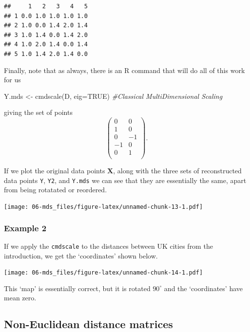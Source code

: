 \documentclass[
]{book}
\newenvironment{Shaded}{\begin{snugshade}}{\end{snugshade}}
\newcommand{\AttributeTok}[1]{\textcolor[rgb]{0.77,0.63,0.00}{#1}}
\newcommand{\CommentTok}[1]{\textcolor[rgb]{0.56,0.35,0.01}{\textit{#1}}}
\newcommand{\ConstantTok}[1]{\textcolor[rgb]{0.00,0.00,0.00}{#1}}
\newcommand{\FunctionTok}[1]{\textcolor[rgb]{0.00,0.00,0.00}{#1}}
\newcommand{\NormalTok}[1]{#1}
\newcommand{\OtherTok}[1]{\textcolor[rgb]{0.56,0.35,0.01}{#1}}
\theoremstyle{definition}
\theoremstyle{definition}
\theoremstyle{definition}
\theoremstyle{definition}
\theoremstyle{remark}
\begin{document}
\begin{verbatim}
##     1   2   3   4   5
## 1 0.0 1.0 1.0 1.0 1.0
## 2 1.0 0.0 1.4 2.0 1.4
## 3 1.0 1.4 0.0 1.4 2.0
## 4 1.0 2.0 1.4 0.0 1.4
## 5 1.0 1.4 2.0 1.4 0.0
\end{verbatim}

Finally, note that as always, there is an R command that will do all of this work for us

\begin{Shaded}
\begin{Highlighting}[]
\NormalTok{Y.mds }\OtherTok{\textless{}{-}} \FunctionTok{cmdscale}\NormalTok{(D, }\AttributeTok{eig=}\ConstantTok{TRUE}\NormalTok{) }\CommentTok{\#Classical MultiDimensional Scaling}
\end{Highlighting}
\end{Shaded}

giving the set of points
\[\begin{pmatrix}0&0 \\1&0 \\0&-1 \\-1&0 \\0&1 \\\end{pmatrix}.\]

If we plot the original data points \(\mathbf X\), along with the three sets of reconstructed data points \texttt{Y}, \texttt{Y2}, and \texttt{Y.mds} we can see that they are essentially the same, apart from being rotatated or reordered.

\texttt{[image: 06-mds\_files/figure-latex/unnamed-chunk-13-1.pdf]}

\hypertarget{example-2}{%
\subsubsection*{Example 2}\label{example-2}}

If we apply the \texttt{cmdscale} to the distances between UK cities from the introduction, we get the `coordinates' shown below.

\texttt{[image: 06-mds\_files/figure-latex/unnamed-chunk-14-1.pdf]}

This `map' is essentially correct, but it is rotated \(90^\circ\) and the `coordinates' have mean zero.

\hypertarget{non-euclidean-distance-matrices}{%
\subsection{Non-Euclidean distance matrices}\label{non-euclidean-distance-matrices}}
\end{document}
